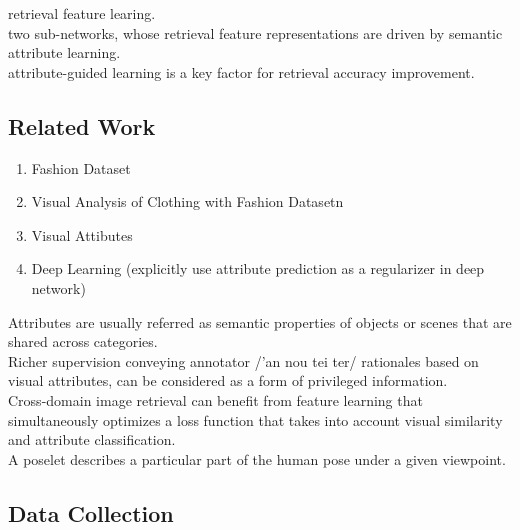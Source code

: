 \documentclass[11pt]{article}
\begin{document}
retrieval feature learing. \\

two sub-networks, whose retrieval feature representations are driven by semantic attribute learning. \\

attribute-guided learning is a key factor for retrieval accuracy improvement. \\

\subsection{Related Work}
\label{sec-9-1}
\begin{enumerate}
\item Fashion Dataset \\
\item Visual Analysis of Clothing with Fashion Datasetn \\
\item Visual Attibutes \\
\item Deep Learning (explicitly use attribute prediction as a regularizer in deep network) \\
\end{enumerate}

Attributes are usually referred as semantic properties of objects or scenes that are shared across categories. \\

Richer supervision conveying annotator /'an nou tei ter/ rationales based on visual attributes, can be considered as a form of privileged information. \\
Cross-domain image retrieval can benefit from feature learning that simultaneously optimizes a loss function that takes into account visual similarity and attribute classification. \\

A poselet describes a particular part of the human pose under a given viewpoint. \\

\subsection{Data Collection}
\label{sec-9-2}
\end{document}
